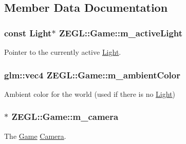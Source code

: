 \subsection{Member Data Documentation}
\hypertarget{class_z_e_g_l_1_1_game_aa8ac2fd79809c3ad3477a4d723a7ae10}{}
\subsubsection[{m\+\_\+active\+Light}]{\setlength{\rightskip}{0pt plus 5cm}const {\bf Light}$\ast$ Z\+E\+G\+L\+::\+Game\+::m\+\_\+active\+Light\hspace{0.3cm}{\ttfamily [protected]}}\label{class_z_e_g_l_1_1_game_aa8ac2fd79809c3ad3477a4d723a7ae10}
Pointer to the currently active \hyperlink{class_z_e_g_l_1_1_light}{Light}. \hypertarget{class_z_e_g_l_1_1_game_a79bbd0830a4ac01cc820ba5a9bd26cd6}{}
\subsubsection[{m\+\_\+ambient\+Color}]{\setlength{\rightskip}{0pt plus 5cm}glm\+::vec4 Z\+E\+G\+L\+::\+Game\+::m\+\_\+ambient\+Color\hspace{0.3cm}{\ttfamily [protected]}}\label{class_z_e_g_l_1_1_game_a79bbd0830a4ac01cc820ba5a9bd26cd6}
Ambient color for the world (used if there is no \hyperlink{class_z_e_g_l_1_1_light}{Light}) \hypertarget{class_z_e_g_l_1_1_game_a75bf1aabc1dc5ad273611618c3ee05cf}{}
\subsubsection[{m\+\_\+camera}]{$\ast$ Z\+E\+G\+L\+::\+Game\+::m\+\_\+camera\hspace{0.3cm}{\ttfamily [protected]}}\label{class_z_e_g_l_1_1_game_a75bf1aabc1dc5ad273611618c3ee05cf}
The \hyperlink{class_z_e_g_l_1_1_game}{Game} \hyperlink{class_z_e_g_l_1_1_camera}{Camera}. \hypertarget{class_z_e_g_l_1_1_game_ab7239deb1a14053ae2d757994f2211d0}{}
